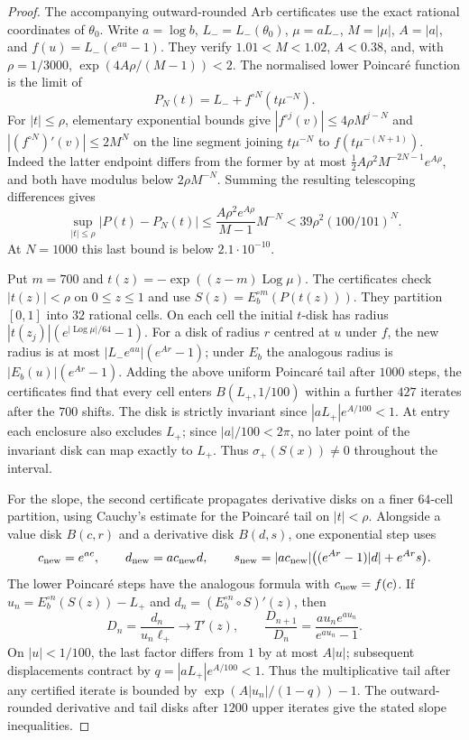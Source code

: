 \documentclass[11pt,a4paper]{article}
\theoremstyle{definition}
\begin{document}
\begin{proof}
The accompanying outward-rounded Arb certificates use the exact
rational coordinates of $\theta_0$.  Write $a=\log b$, $L_-=L_-(\theta_0)$,
$\mu=aL_-$, $M=|\mu|$, $A=|a|$, and
$f(u)=L_-(e^{au}-1)$.  They verify
$1.01<M<1.02$, $A<0.38$, and, with $\rho=1/3000$,
$\exp(4A\rho/(M-1))<2$.  The normalised lower Poincar\'e
function is the limit of
\[
 P_N(t)=L_-+f^{\circ N}(t\mu^{-N}).
\]
For $|t|\le\rho$, elementary exponential bounds give
$|f^{\circ j}(v)|\le4\rho M^{j-N}$ and
$|(f^{\circ N})'(v)|\le2M^N$ on the line segment joining
$t\mu^{-N}$ to $f(t\mu^{-(N+1)})$.
Indeed the latter endpoint differs from the former by at most
$\frac12 A\rho^2M^{-2N-1}e^{A\rho}$, and both have modulus below
$2\rho M^{-N}$.  Summing the resulting telescoping differences gives
\[
 \sup_{|t|\le\rho}|P(t)-P_N(t)|
 \le \frac{A\rho^2e^{A\rho}}{M-1}M^{-N}
 <39\rho^2(100/101)^N.
\]
At $N=1000$ this last bound is below $2.1\cdot10^{-10}$.

Put $m=700$ and $t(z)=-\exp((z-m)\operatorname{Log}\mu)$.
The certificates check $|t(z)|<\rho$ on $0\le z\le1$ and use
$S(z)=E_b^{\circ m}(P(t(z)))$.  They partition $[0,1]$ into
$32$ rational cells.  On each cell the initial $t$-disk has radius
$|t(z_j)|(e^{|\operatorname{Log}\mu|/64}-1)$.  For a disk of radius $r$ centred
at $u$ under $f$, the new radius is at most
$|L_-e^{au}|(e^{Ar}-1)$; under $E_b$ the analogous radius is
$|E_b(u)|(e^{Ar}-1)$.  Adding the above uniform Poincar\'e tail
after $1000$ steps, the certificates find that every cell enters
$B(L_+,1/100)$ within a further $427$ iterates after the $700$
shifts.  The disk is strictly invariant since
$|aL_+|e^{A/100}<1$.  At entry each enclosure also excludes
$L_+$; since $|a|/100<2\pi$, no later point of the invariant
disk can map exactly to $L_+$.  Thus $\sigma_+(S(x))\ne0$
throughout the interval.

For the slope, the second certificate propagates derivative disks
on a finer $64$-cell partition, using Cauchy's estimate for the
Poincar\'e tail on $|t|<\rho$.  Alongside a value disk
$B(c,r)$ and a derivative disk $B(d,s)$, one exponential step uses
\[
 c_{\rm new}=e^{ac},\qquad d_{\rm new}=ac_{\rm new}d,\qquad
 s_{\rm new}=|ac_{\rm new}|
 \bigl((e^{Ar}-1)|d|+e^{Ar}s\bigr).
\]
The lower Poincar\'e steps have the analogous formula with
$c_{\rm new}=f(c)$.  If
$u_n=E_b^{\circ n}(S(z))-L_+$ and
$d_n=(E_b^{\circ n}\circ S)'(z)$, then
\[
 D_n=\frac{d_n}{u_n\ell_+}\longrightarrow T'(z),\qquad
 \frac{D_{n+1}}{D_n}
 =\frac{au_ne^{au_n}}{e^{au_n}-1}.
\]
On $|u|<1/100$, the last factor differs from $1$ by at most
$A|u|$; subsequent displacements contract by
$q=|aL_+|e^{A/100}<1$.  Thus the multiplicative tail after
any certified iterate is bounded by
$\exp(A|u_n|/(1-q))-1$.  The outward-rounded derivative and
tail disks after $1200$ upper iterates give the stated slope
inequalities.


\end{proof}
\end{document}
